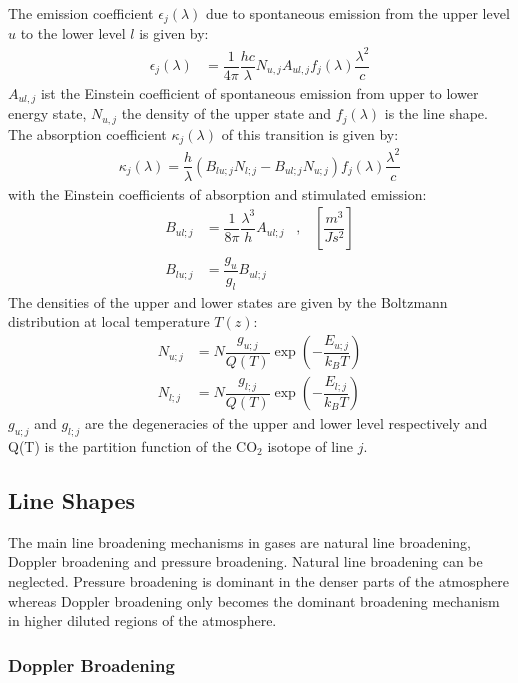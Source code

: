 \begin{itemize}
\begin{itemize}
The emission coefficient $\epsilon_j(\lambda)$ due to spontaneous emission from the upper level $u$ to the lower level $l$ is given by:
\begin{align}
	\epsilon_j(\lambda) &= \dfrac{1}{4 \pi} \dfrac{h c}{\lambda} N_{u,j} A_{ul,j} f_j(\lambda)
	 \dfrac{\lambda^2}{c}
\end{align}
$A_{ul,j}$ ist the Einstein coefficient of spontaneous emission from upper to lower energy state, $N_{u,j} $ the density of the upper state and $f_j(\lambda)$ is the line shape. The absorption coefficient $\kappa_j(\lambda)$ of this transition is given by:
\begin{align}
	\kappa_j(\lambda)  = \dfrac{h}{\lambda}  \left(  B_{lu;j} N_{l;j} -  B_{ul;j} N_{u;j} \right) f_j(\lambda)
	 \dfrac{\lambda^2}{c}
\end{align}
with the Einstein coefficients of absorption and stimulated emission:
\begin{align}
	B_{ul;j} &= \dfrac{1}{8 \pi} \dfrac{\lambda^3}{h} A_{ul;j} \;\;\; , \;\;\; \left[\dfrac{m^3}{J s^2}\right] \\
	B_{lu;j} &= \dfrac{g_u}{g_l} B_{ul;j}
\end{align}
The densities of the upper and lower states are given by the Boltzmann distribution at local temperature $T(z)$:
\begin{align}
	N_{u;j} &= N \dfrac{g_{u;j}}{Q(T)} \exp\left(- \dfrac{E_{u;j}}{k_B T} \right) \\
	N_{l;j} &= N \dfrac{g_{l;j}}{Q(T)} \exp\left(- \dfrac{E_{l;j}}{k_B T} \right)
\end{align}
$g_{u;j}$ and $g_{l;j}$ are the degeneracies of the upper and lower level respectively and Q(T) is the partition function of the $\mathrm{CO}_2$ isotope of line $j$.



\subsection{Line Shapes}

The main line broadening mechanisms in gases are natural line broadening, Doppler broadening and pressure broadening. Natural line broadening can be neglected. Pressure broadening is dominant in the denser parts of the atmosphere whereas Doppler broadening only becomes the dominant broadening mechanism in higher diluted regions of the atmosphere.

\subsubsection{Doppler Broadening}


\end{itemize}
\end{itemize}
